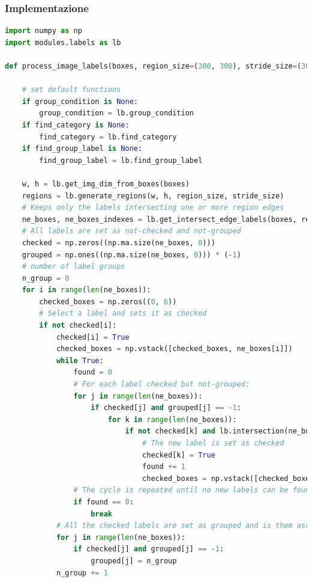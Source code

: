 \subsubsection{Implementazione}
\begin{lstlisting}[language=Python, caption=Python example]
import numpy as np
import modules.labels as lb

def process_image_labels(boxes, region_size=(300, 300), stride_size=(300, 300), overlap=(0, 0), tol=0, threshold_match=50, group_condition=None, find_category=None, find_group_label=None):

    # set default functions
    if group_condition is None:
        group_condition = lb.group_condition
    if find_category is None:
        find_category = lb.find_category
    if find_group_label is None:
        find_group_label = lb.find_group_label

    w, h = lb.get_img_dim_from_boxes(boxes)
    regions = lb.generate_regions(w, h, region_size, stride_size)
    # Keeps only the labels intersecting one or more region edges
    ne_boxes, ne_boxes_indexes = lb.get_intersect_edge_labels(boxes, regions, tol, overlap)
    # All labels are set as not-checked and not-grouped
    checked = np.zeros((np.ma.size(ne_boxes, 0)))
    grouped = np.ones((np.ma.size(ne_boxes, 0))) * (-1)
    # number of label groups
    n_group = 0
    for i in range(len(ne_boxes)):
        checked_boxes = np.zeros((0, 6))
        # Select a label and sets it as checked
        if not checked[i]:
            checked[i] = True
            checked_boxes = np.vstack([checked_boxes, ne_boxes[i]])
            while True:
                found = 0
                # For each label checked but not-grouped:
                for j in range(len(ne_boxes)):
                    if checked[j] and grouped[j] == -1:
                        for k in range(len(ne_boxes)):
                            if not checked[k] and lb.intersection(ne_boxes[j], ne_boxes[k], tol) and group_condition(ne_boxes[j], ne_boxes[k]) and lb.matched(ne_boxes[j], ne_boxes[k], threshold_match) and not lb.belong_same_region_strict_group(ne_boxes[k], checked_boxes, regions, 0):
                                # The new label is set as checked
                                checked[k] = True
                                found += 1
                                checked_boxes = np.vstack([checked_boxes, ne_boxes[k]])
                # The cycle is repeated until no new labels can be found
                if found == 0:
                    break
            # All the checked labels are set as grouped and is them assigned a number with the purpose to identify their group ID
            for j in range(len(ne_boxes)):
                if checked[j] and grouped[j] == -1:
                    grouped[j] = n_group
            n_group += 1


\end{lstlisting}
